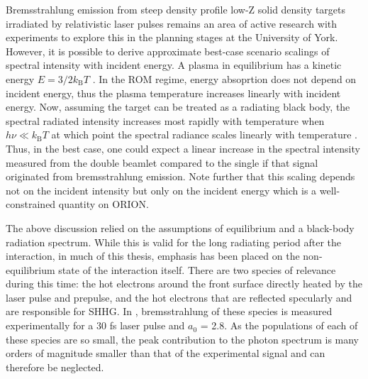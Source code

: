 Bremsstrahlung emission from steep density profile low-Z solid density targets irradiated by relativistic laser pulses remains an area of active research with experiments to explore this in the planning stages at the University of York. However, it is possible to derive approximate best-case scenario scalings of spectral intensity with incident energy. A plasma in equilibrium has a kinetic energy $E = 3/2 k_\mathrm{B}T$ \cite{chenIntroductionPlasmaPhysics2016}. In the ROM regime, energy absoprtion does not depend on incident energy, thus the plasma temperature increases linearly with incident energy. Now, assuming the target can be treated as a radiating black body, the spectral radiated intensity increases most rapidly with temperature when $h\nu \ll k_\mathrm{B}T$ at which point the spectral radiance scales linearly with temperature \cite{zangwillGuidedConfinedWaves2012}. Thus, in the best case, one could expect a linear increase in the spectral intensity measured from the double beamlet compared to the single if that signal originated from bremsstrahlung emission. Note further that this scaling depends not on the incident intensity but only on the incident energy which is a well-constrained quantity on ORION.

The above discussion relied on the assumptions of equilibrium and a black-body radiation spectrum. While this is valid for the long radiating period after the interaction, in much of this thesis, emphasis has been placed on the non-equilibrium state of the interaction itself. There are two species of relevance during this time: the hot electrons around the front surface directly heated by the laser pulse and prepulse, and the hot electrons that are reflected specularly and are responsible for SHHG. In \cite{zulickHighResolutionBremsstrahlung2013}, bremsstrahlung of these species is measured experimentally for a 30 fs laser pulse and $a_0$ = 2.8. As the populations of each of these species are so small, the peak contribution to the photon spectrum is many orders of magnitude smaller than that of the experimental signal and can therefore be neglected.

